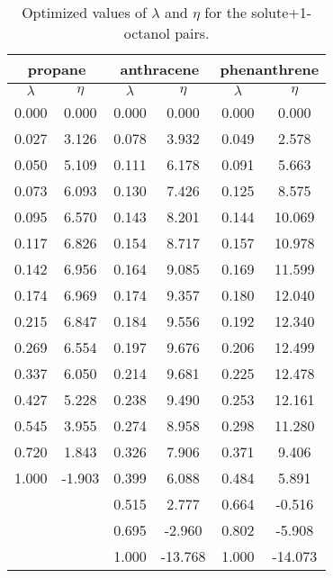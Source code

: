 \documentclass[preprint,12p,times]{elsarticle}
\begin{document}
	\begin{table}[h]
		\centering
		\caption{Optimized values of $\lambda $ and $\eta$ for the solute+1-octanol pairs.}
		\begin{tabular}{cccccc}
			\hline\hline
			\multicolumn{2}{c}{propane}& \multicolumn{2}{c}{anthracene}& \multicolumn{2}{c}{phenanthrene}\\
			\hline\hline
			$\lambda$ & $\eta$ & $\lambda$ & $\eta$  & $\lambda$ & $\eta$   \\ 
			\hline\hline
			0.000    &    0.000    &    0.000    &    0.000    &    0.000    &    0.000    \\
			0.027    &    3.126    &    0.078    &    3.932    &    0.049    &    2.578    \\
			0.050    &    5.109    &    0.111    &    6.178    &    0.091    &    5.663    \\
			0.073    &    6.093    &    0.130    &    7.426    &    0.125    &    8.575    \\
			0.095    &    6.570    &    0.143    &    8.201    &    0.144    &    10.069    \\
			0.117    &    6.826    &    0.154    &    8.717    &    0.157    &    10.978    \\
			0.142    &    6.956    &    0.164    &    9.085    &    0.169    &    11.599    \\
			0.174    &    6.969    &    0.174    &    9.357    &    0.180    &    12.040    \\
			0.215    &    6.847    &    0.184    &    9.556    &    0.192    &    12.340    \\
			0.269    &    6.554    &    0.197    &    9.676    &    0.206    &    12.499    \\
			0.337    &    6.050    &    0.214    &    9.681    &    0.225    &    12.478    \\
			0.427    &    5.228    &    0.238    &    9.490    &    0.253    &    12.161    \\
			0.545    &    3.955    &    0.274    &    8.958    &    0.298    &    11.280    \\
			0.720    &    1.843    &    0.326    &    7.906    &    0.371    &    9.406    \\
			1.000    &    -1.903    &    0.399    &    6.088    &    0.484    &    5.891    \\
			&        &    0.515    &    2.777    &    0.664    &    -0.516    \\
			&        &    0.695    &    -2.960    &    0.802    &    -5.908    \\
			&        &    1.000    &    -13.768    &    1.000    &    -14.073    \\
			\hline\hline
		\end{tabular}
	\end{table}
\end{document}
